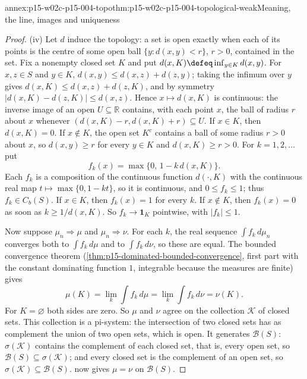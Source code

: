 \begin{annexitem}{annex:p15-w02c-p15-004-topo}{thm:p15-w02c-p15-004-topological-weak}{Meaning, the line, images and uniqueness}
\begin{proof}
(iv) Let \(d\) induce the topology: a set is open exactly when each of
its points is the centre of some open ball \(\{y:d(x,y)<r\}\), \(r>0\),
contained in the set. Fix a nonempty closed set \(K\) and put
\(d(x,K)\defeq\inf_{y\in K}d(x,y)\). For \(x,z\in S\) and \(y\in K\),
\(d(x,y)\leq d(x,z)+d(z,y)\); taking the infimum over \(y\) gives
\(d(x,K)\leq d(x,z)+d(z,K)\), and by symmetry
\(|d(x,K)-d(z,K)|\leq d(x,z)\). Hence \(x\mapsto d(x,K)\) is continuous:
the inverse image of an open \(U\subseteq\mathbb R\) contains, with each
point \(x\), the ball of radius \(r\) about \(x\) whenever
\((d(x,K)-r,d(x,K)+r)\subseteq U\). If \(x\in K\), then
\(d(x,K)=0\). If \(x\notin K\), the open set \(K^c\) contains a ball of
some radius \(r>0\) about \(x\), so \(d(x,y)\geq r\) for every
\(y\in K\) and \(d(x,K)\geq r>0\). For \(k=1,2,\ldots\) put
\[
 f_k(x)=\max\{0,\,1-k\,d(x,K)\}.
\]
Each \(f_k\) is a composition of the continuous function \(d(\cdot,K)\)
with the continuous real map \(t\mapsto\max\{0,1-kt\}\), so it is
continuous, and \(0\leq f_k\leq1\); thus \(f_k\in C_b(S)\). If
\(x\in K\), then \(f_k(x)=1\) for every \(k\). If \(x\notin K\), then
\(f_k(x)=0\) as soon as \(k\geq1/d(x,K)\). So \(f_k\to\mathbf1_K\)
pointwise, with \(|f_k|\leq1\).

Now suppose \(\mu_n\Rightarrow\mu\) and \(\mu_n\Rightarrow\nu\). For
each \(k\), the real sequence \(\int f_k\,d\mu_n\) converges both to
\(\int f_k\,d\mu\) and to \(\int f_k\,d\nu\), so these are equal. The
bounded convergence theorem (\cref{thm:p15-dominated-bounded-convergence},
first part with the constant dominating function \(1\), integrable
because the measures are finite) gives
\[
 \mu(K)=\lim_k\int f_k\,d\mu=\lim_k\int f_k\,d\nu=\nu(K).
\]
For \(K=\varnothing\) both sides are zero. So \(\mu\) and \(\nu\) agree
on the collection \(\mathcal K\) of closed sets. This collection is a
pi-system: the intersection of two closed sets has as complement the
union of two open sets, which is open. It generates \(\mathcal B(S)\):
\(\sigma(\mathcal K)\) contains the complement of each closed set, that
is, every open set, so \(\mathcal B(S)\subseteq\sigma(\mathcal K)\);
and every closed set is the complement of an open set, so
\(\sigma(\mathcal K)\subseteq\mathcal B(S)\).
 now gives \(\mu=\nu\) on
\(\mathcal B(S)\).
\end{proof}
\end{annexitem}

